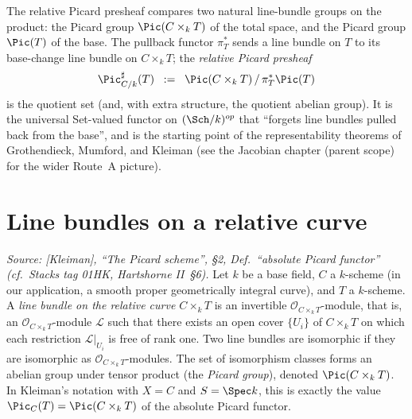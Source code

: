 The relative Picard presheaf compares two natural line-bundle groups on the
product: the Picard group \(\Pic(C \times_k T)\) of the total space, and the
Picard group \(\Pic(T)\) of the base. The pullback functor \(\pi_T^*\) sends a line
bundle on \(T\) to its base-change line bundle on \(C \times_k T\); the
\emph{relative Picard presheaf}
\[
  \Pic^\sharp_{C/k}(T) \;\;:=\;\; \Pic(C \times_k T)\, / \, \pi_T^*\Pic(T)
\]
is the quotient set (and, with extra structure, the quotient abelian group). It
is the universal Set-valued functor on \((\Sch/k)^{op}\) that ``forgets line
bundles pulled back from the base'', and is the starting point of the
representability theorems of Grothendieck, Mumford, and Kleiman (see
the Jacobian chapter (parent scope) for the wider Route~A picture).

\section{Line bundles on a relative curve}
\label{sec:lbp_line_bundle}

\begin{definition}
  \label{def:line_bundle_on_product}
  \textit{Source: [Kleiman], ``The Picard scheme'', §2,
  Def.~``absolute Picard functor''
  (cf.\ Stacks tag 01HK, Hartshorne II~§6).}
  Let \(k\) be a base field, \(C\) a \(k\)-scheme (in our application, a smooth proper
  geometrically integral curve), and \(T\) a \(k\)-scheme. A
  \emph{line bundle on the relative curve \(C \times_k T\)} is an invertible
  \(\mathcal{O}_{C \times_k T}\)-module, that is, an
  \(\mathcal{O}_{C \times_k T}\)-module \(\mathcal{L}\) such that there exists an
  open cover \(\{U_i\}\) of \(C \times_k T\) on which each restriction
  \(\mathcal{L}|_{U_i}\) is free of rank one. Two line bundles are isomorphic if
  they are isomorphic as \(\mathcal{O}_{C \times_k T}\)-modules. The set of
  isomorphism classes forms an abelian group under tensor product (the
  \emph{Picard group}), denoted
  \(\Pic(C \times_k T)\). In Kleiman's notation with \(X = C\) and \(S = \Spec k\),
  this is exactly the value
  \(\Pic_C(T) = \Pic(C \times_k T)\) of the absolute Picard functor.
\end{definition}

